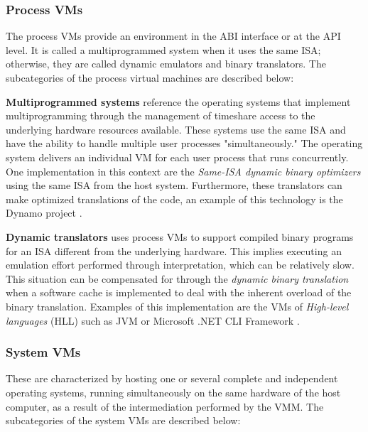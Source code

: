 
	\subsubsection{Process VMs}
	
	The process VMs provide an environment in the ABI interface or at the API level. 
	It is called a multiprogrammed system when it uses the same ISA; otherwise, they are called dynamic emulators and binary translators. 
	The subcategories of the process virtual machines are described below: 
	
	\textbf{Multiprogrammed systems} reference the operating systems that implement multiprogramming through the management of timeshare access to the underlying hardware resources available. These systems use the same ISA and have the ability to handle multiple user processes "simultaneously." The operating system delivers an individual VM for each user process that runs concurrently. One implementation in this context are the \textit{Same-ISA dynamic binary optimizers} using the same ISA from the host system. Furthermore, these translators can make optimized translations of the code, an example of this technology is the Dynamo project \cite{Bala2011}. 
	
	\textbf{Dynamic translators} uses process VMs to support compiled binary programs for an ISA different from the underlying hardware. This implies executing an emulation effort performed through interpretation, which can be relatively slow. This situation can be compensated for through the \textit{dynamic binary translation} when a software cache is implemented to deal with the inherent overload of the binary translation. Examples of this implementation are the VMs of \textit{High-level languages} (HLL)  such as JVM \cite{Lindholm1997} or Microsoft .NET CLI Framework \cite{Fisher2006, Thai2003}.

	\subsubsection{System VMs}
	
	These are characterized by hosting one or several complete and independent operating systems, running simultaneously on the same hardware of the host computer, as a result of the intermediation performed by the VMM. The subcategories of the system VMs are described below:
	
	
